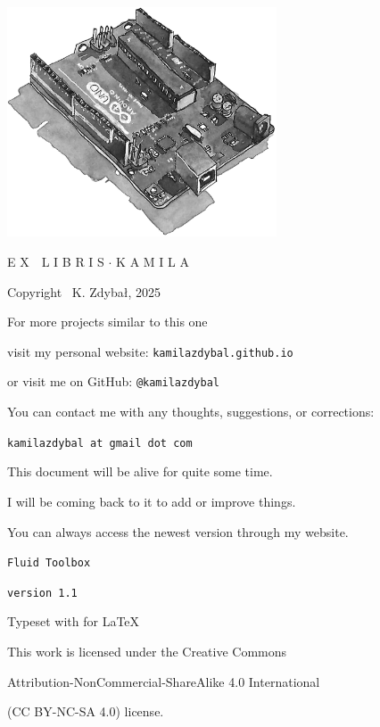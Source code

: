 \documentclass[12pt]{report}
\begin{document}
\thispagestyle{empty}
\begin{center}
\vspace*{1cm}
\includegraphics[width = 80mm]{ex_libris_arduino.jpg}

\vspace*{1cm}

{\fontsize{18}{10}\selectfont {}\selectfont E X \,\, L I B R I S $\cdotp$ K A M I L A}

\vspace*{2cm}

Copyright \textcopyright \, K. Zdybał, 2025

For more projects similar to this one

visit my personal website: \verb|kamilazdybal.github.io|

or visit me on GitHub: \verb|@kamilazdybal|

You can contact me with any thoughts, suggestions, or corrections:

\verb|kamilazdybal at gmail dot com|

\vspace*{0.6cm}

This document will be alive for quite some time. 

I will be coming back to it to add or improve things. 

You can always access the newest version through my website.

\vspace*{1.8cm}

\verb|Fluid Toolbox|

\verb|version 1.1|

Typeset with  for \LaTeX

\vspace*{1.8cm}

\noindent This work is licensed under the Creative Commons

Attribution-NonCommercial-ShareAlike 4.0 International 

(CC BY-NC-SA
4.0) license.
\end{center}
\end{document}
